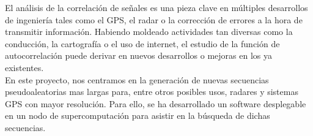 El análisis de la correlación de señales es una pieza clave en múltiples
desarrollos de ingeniería tales como el GPS, el radar o la corrección de errores
a la hora de transmitir información. Habiendo moldeado actividades tan diversas
como la conducción, la cartografía o el uso de internet, el estudio de la
función de autocorrelación puede derivar en nuevos desarrollos o mejoras en
los ya existentes. \\

En este proyecto, nos centramos en la generación de nuevas secuencias
pseudoaleatorias mas largas para, entre otros posibles usos, radares y sistemas
GPS con mayor resolución. Para ello, se ha desarrollado un software desplegable
en un nodo de supercomputación para asistir en la búsqueda de dichas
secuencias.
